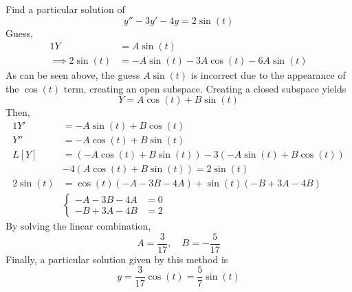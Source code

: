 \documentclass[twoside]{report}
\begin{document}
    \begin{example}
        Find a particular solution of
        \begin{equation}
            y'' - 3y' - 4y = 2\sin(t)
        \end{equation}
        Guess,
        \begin{alignat}{1}
            Y &= A\sin(t)\\
            \implies  2\sin(t) &= -A\sin(t)-3A\cos(t)-6A\sin(t)
        \end{alignat}
        As can be seen above, the guess $A\sin(t)$ is incorrect due to the appearance of the $\cos(t)$ term, creating an open subspace. Creating a closed subspace yields
        \begin{equation}
            Y = A\cos(t) + B\sin(t)
        \end{equation}
        Then,
        \begin{alignat}{1}
            Y' &= -A\sin(t) + B\cos(t)\\
            Y'' &= -A\cos(t) + B\sin(t)\\
            L[Y] &= (-A\cos(t) + B\sin(t)) -3(-A\sin(t) + B\cos(t))\\
            &-4(A\cos(t) + B\sin(t)) = 2\sin(t)\\
            2\sin(t) &=\cos(t)(-A-3B-4A) + \sin(t)(-B+3A-4B)\\
            &\begin{cases}
                -A-3B-4A &= 0\\
                -B+3A-4B &= 2
            \end{cases}
        \end{alignat}
        By solving the linear combination,
        \begin{equation}
            A = \frac{3}{17},\quad B = -\frac{5}{17}
        \end{equation}
        Finally, a particular solution given by this method is
        \begin{equation}
            y = \frac{3}{17}\cos(t) = \frac{5}{7}\sin(t)
        \end{equation}
    \end{example}
    \np
\end{document}
